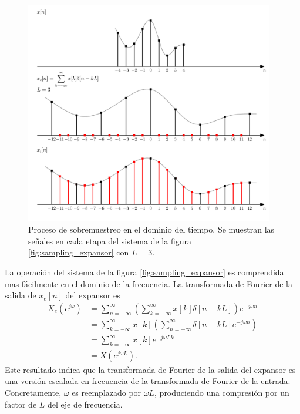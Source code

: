 \documentclass[a4paper]{report}
\begin{document}
\begin{figure}[!htb]
 \begin{center}
 \includegraphics[width=0.97\textwidth]{figuras/sampling_increase_sampling_rate_time_domain.pdf}
 \caption{\label{fig:sampling_increase_sampling_rate_time_domain} Proceso de sobremuestreo en el dominio del tiempo. Se muestran las señales en cada etapa del sistema de la figura \ref{fig:sampling_expansor} con \(L=3\).}
 \end{center}
\end{figure}

La operación del sistema de la figura \ref{fig:sampling_expansor} es comprendida mas fácilmente en el dominio de la frecuencia. La transformada de Fourier de la salida de \(x_e[n]\) del expansor es
\begin{align*}
X_e(e^{j\omega})&=\sum_{n=-\infty}^{\infty}\left(\sum_{k=-\infty}^{\infty}x[k]\delta[n-kL]\right)e^{-j\omega n}\\
 &=\sum_{k=-\infty}^{\infty}x[k]\left(\sum_{n=-\infty}^{\infty}\delta[n-kL]e^{-j\omega n}\right)\\
 &=\sum_{k=-\infty}^{\infty}x[k]e^{-j\omega Lk}\\
 &=X(e^{j\omega L}).
\end{align*}
Este resultado indica que la transformada de Fourier de la salida del expansor es una versión escalada en frecuencia de la transformada de Fourier de la entrada. Concretamente, \(\omega\) es reemplazado por \(\omega L\), produciendo una compresión por un factor de \(L\) del eje de frecuencia. 
\end{document}
